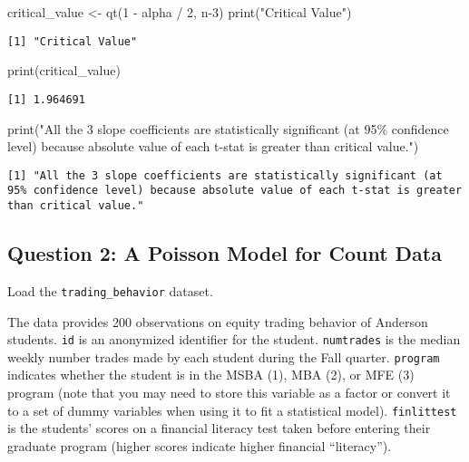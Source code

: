 \documentclass[
  letterpaper,
  DIV=11,
  numbers=noendperiod]{scrartcl}
\newenvironment{Shaded}{\begin{snugshade}}{\end{snugshade}}
\newcommand{\DecValTok}[1]{\textcolor[rgb]{0.68,0.00,0.00}{#1}}
\newcommand{\FunctionTok}[1]{\textcolor[rgb]{0.28,0.35,0.67}{#1}}
\newcommand{\NormalTok}[1]{\textcolor[rgb]{0.00,0.23,0.31}{#1}}
\newcommand{\OtherTok}[1]{\textcolor[rgb]{0.00,0.23,0.31}{#1}}
\newcommand{\SpecialCharTok}[1]{\textcolor[rgb]{0.37,0.37,0.37}{#1}}
\newcommand{\StringTok}[1]{\textcolor[rgb]{0.13,0.47,0.30}{#1}}
\begin{document}
\begin{Shaded}
\begin{Highlighting}[]
\NormalTok{critical\_value }\OtherTok{\textless{}{-}} \FunctionTok{qt}\NormalTok{(}\DecValTok{1} \SpecialCharTok{{-}}\NormalTok{ alpha }\SpecialCharTok{/} \DecValTok{2}\NormalTok{, n}\DecValTok{{-}3}\NormalTok{)}
\FunctionTok{print}\NormalTok{(}\StringTok{"Critical Value"}\NormalTok{)}
\end{Highlighting}
\end{Shaded}

\begin{verbatim}
[1] "Critical Value"
\end{verbatim}

\begin{Shaded}
\begin{Highlighting}[]
\FunctionTok{print}\NormalTok{(critical\_value)}
\end{Highlighting}
\end{Shaded}

\begin{verbatim}
[1] 1.964691
\end{verbatim}

\begin{Shaded}
\begin{Highlighting}[]
\FunctionTok{print}\NormalTok{(}\StringTok{"All the 3 slope coefficients are statistically significant (at 95\% confidence level) because absolute value of each t{-}stat is greater than critical value."}\NormalTok{)}
\end{Highlighting}
\end{Shaded}

\begin{verbatim}
[1] "All the 3 slope coefficients are statistically significant (at 95% confidence level) because absolute value of each t-stat is greater than critical value."
\end{verbatim}

\newpage

\hypertarget{question-2-a-poisson-model-for-count-data}{%
\subsection{Question 2: A Poisson Model for Count
Data}\label{question-2-a-poisson-model-for-count-data}}

Load the \texttt{trading\_behavior} dataset.

The data provides 200 observations on equity trading behavior of
Anderson students. \texttt{id} is an anonymized identifier for the
student. \texttt{numtrades} is the median weekly number trades made by
each student during the Fall quarter. \texttt{program} indicates whether
the student is in the MSBA (1), MBA (2), or MFE (3) program (note that
you may need to store this variable as a factor or convert it to a set
of dummy variables when using it to fit a statistical model).
\texttt{finlittest} is the students' scores on a financial literacy test
taken before entering their graduate program (higher scores indicate
higher financial ``literacy'').
\end{document}
